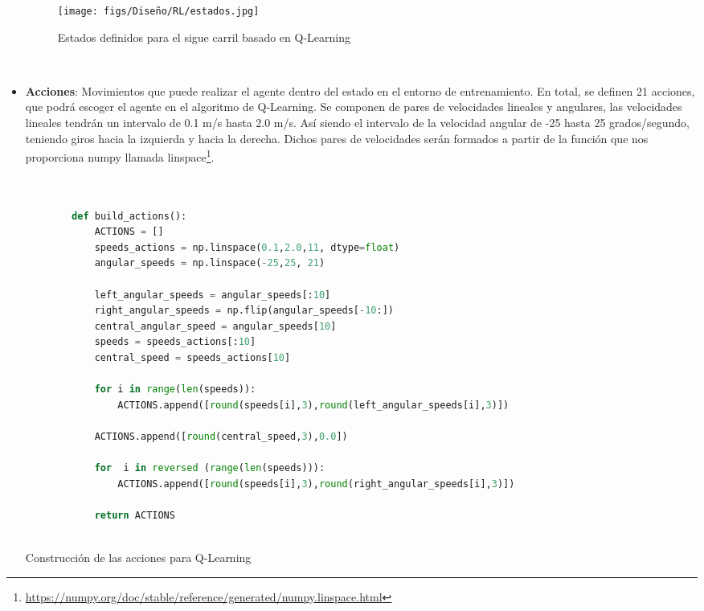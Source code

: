 \begin{itemize}
    \begin{figure} [H]
      \begin{center}
        \texttt{[image: figs/Diseño/RL/estados.jpg]}
      \end{center}
      \caption{Estados definidos para el sigue carril basado en Q-Learning}
      \label{fig:Estados}
    \end{figure}\

    \item \textbf{Acciones}: Movimientos que puede realizar el agente dentro del estado en el entorno de entrenamiento. En total, se definen 21 acciones, que podrá escoger el agente en el algoritmo de Q-Learning. Se componen de pares de velocidades lineales y angulares, las velocidades lineales
    tendrán un intervalo de 0.1 m/s hasta 2.0 m/s. Así siendo el intervalo de la velocidad angular de -25 hasta 25 grados/segundo, teniendo giros hacia la izquierda y hacia la derecha. Dichos pares
    de velocidades serán formados a partir de la función que nos proporciona numpy llamada linspace\footnote{\url{https://numpy.org/doc/stable/reference/generated/numpy.linspace.html}}. \newline
  
    \begin{code}[H]
      \begin{lstlisting}[language=Python]
  
        
        def build_actions():
            ACTIONS = []
            speeds_actions = np.linspace(0.1,2.0,11, dtype=float)
            angular_speeds = np.linspace(-25,25, 21)
        
            left_angular_speeds = angular_speeds[:10]
            right_angular_speeds = np.flip(angular_speeds[-10:])
            central_angular_speed = angular_speeds[10]
            speeds = speeds_actions[:10]
            central_speed = speeds_actions[10]
        
            for i in range(len(speeds)):
                ACTIONS.append([round(speeds[i],3),round(left_angular_speeds[i],3)])
        
            ACTIONS.append([round(central_speed,3),0.0])
        
            for  i in reversed (range(len(speeds))):
                ACTIONS.append([round(speeds[i],3),round(right_angular_speeds[i],3)])
  
            return ACTIONS
       
      \end{lstlisting}
      \caption[Construcción de las acciones para Q-Learning]{Construcción de las acciones para Q-Learning}
      \label{cod:Acciones}
      \end{code}
      

\end{itemize}
